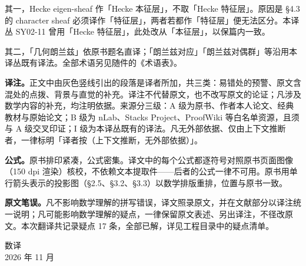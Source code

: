 其一，Hecke eigen-sheaf 作「Hecke 本征层」，不取「Hecke 特征层」。原因是 \S4.3 的 character sheaf 必须译作「特征层」，两者若都作「特征层」便无法区分。本译丛 SY02-11 曾用「Hecke 特征层」，此处改从「本征层」，以保篇内一致。

其二，「几何朗兰兹」依原书题名直译；「朗兰兹对应」「朗兰兹对偶群」等沿用本译丛既有译法。全部术语另见随件的《术语表》。

\textbf{译注。}正文中由灰色竖线引出的段落是译者所加，共三类：易错处的预警、原文含混处的点拨、背景与直觉的补充。译注不代替原文，也不改写原文的论证；凡涉及数学内容的补充，均注明依据。来源分三级：A 级为原书、作者本人论文、经典教材与原始论文；B 级为 nLab、Stacks Project、ProofWiki 等白名单资源，且须与 A 级交叉印证；I 级为本译丛既有的译法。凡无外部依据、仅由上下文推断者，一律标明「译者按（上下文推断，无外部依据）」。

\textbf{公式。}原书排印紧凑，公式密集。译文中的每个公式都逐符号对照原书页面图像（150 dpi 渲染）核校，不依赖文本提取件——后者的公式一律不可用。原书用单行箭头表示的投影图（\S2.5、\S3.2、\S3.3）以数学排版重排，位置与原书一致。

\textbf{原文笔误。}凡不影响数学理解的拼写错误，译文照录原文，并在文献部分以译注统一说明；凡可能影响数学理解的疑点，一律保留原文表述、另出译注，不径改原文。本次翻译共记录疑点 17 条，全部已解，详见工程目录中的疑点清单。

\vspace{1.5em}
\noindent 数译\\
2026 年 11 月
\clearpage
